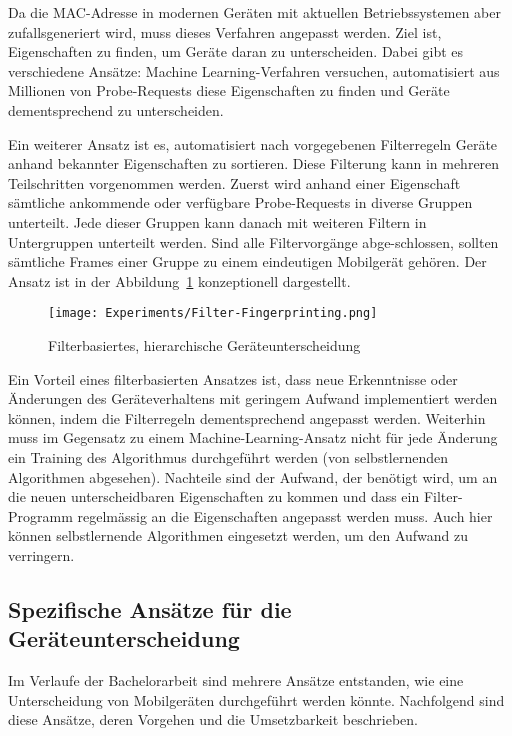 Da die MAC-Adresse in modernen Geräten mit aktuellen Betriebssystemen aber
zufallsgeneriert wird, muss dieses Verfahren angepasst werden.
Ziel ist, Eigenschaften zu finden, um Geräte daran zu unterscheiden.
Dabei gibt es verschiedene Ansätze: Machine Learning-Verfahren versuchen, 
automatisiert aus Millionen von Probe-Requests diese Eigenschaften zu finden 
und Geräte dementsprechend zu unterscheiden.

\clearpage

Ein weiterer Ansatz ist es, automatisiert nach vorgegebenen Filterregeln 
Geräte anhand bekannter Eigenschaften zu sortieren. Diese Filterung kann 
in mehreren Teilschritten vorgenommen werden. Zuerst wird anhand einer 
Eigenschaft sämtliche ankommende oder verfügbare Probe-Requests in diverse 
Gruppen unterteilt. Jede dieser Gruppen kann danach mit weiteren Filtern 
in Untergruppen unterteilt werden. Sind alle Filtervorgänge abge-schlossen,
sollten sämtliche Frames einer Gruppe zu einem eindeutigen Mobilgerät gehören.
Der Ansatz ist in der Abbildung~\ref{figure:sophisticatedfingerprinting} 
konzeptionell dargestellt.

\begin{figure}[h!]
    \centering
    \texttt{[image: Experiments/Filter-Fingerprinting.png]}
    \caption{Filterbasiertes, hierarchische Geräteunterscheidung
    \label{figure:sophisticatedfingerprinting}}
\end{figure}

\clearpage

Ein Vorteil eines filterbasierten Ansatzes ist, dass neue Erkenntnisse oder 
Änderungen des Geräteverhaltens mit geringem Aufwand implementiert werden können,
indem die Filterregeln dementsprechend angepasst werden. 
Weiterhin muss im Gegensatz zu einem Machine-Learning-Ansatz nicht für jede 
Änderung ein Training des Algorithmus durchgeführt werden (von selbstlernenden
Algorithmen abgesehen). 
Nachteile sind der Aufwand, der benötigt wird, um an die neuen unterscheidbaren
Eigenschaften zu kommen und dass ein Filter-Programm regelmässig 
an die Eigenschaften angepasst werden muss.
Auch hier können selbstlernende Algorithmen eingesetzt werden, um den Aufwand 
zu verringern. 

\clearpage

\subsection{Spezifische Ansätze für die Geräteunterscheidung
\label{subsection:specificapproaches}}
Im Verlaufe der Bachelorarbeit sind mehrere Ansätze entstanden, wie 
eine Unterscheidung von Mobilgeräten durchgeführt werden könnte.
Nachfolgend sind diese Ansätze, deren Vorgehen und die Umsetzbarkeit 
beschrieben.

